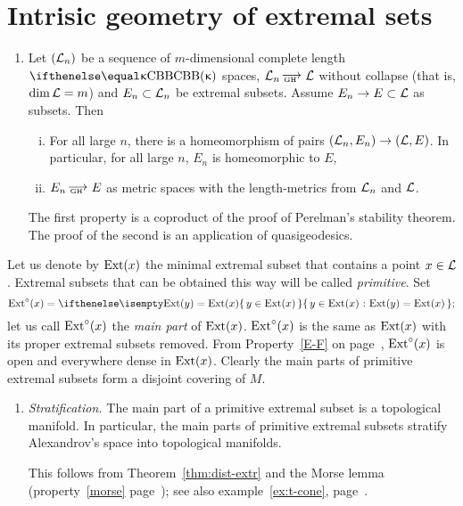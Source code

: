 \section{Intrisic geometry of extremal sets}

\begin{enumerate}
\item 
Let $(\mathcal{L}_n)$ be a sequence of $m$-dimensional complete length $\Alex\kappa$ spaces, 
$\spc{L}_n\GHto \spc{L}$ without collapse 
(that is, $\mathop{\rm dim}\nolimits \mathcal{L}=m$) and $E_n\subset \spc{L}_n$ be extremal subsets. 
Assume $E_n\to E\subset \spc{L}$ as subsets. 
Then 
\begin{enumerate}[(i)]
\item\cite[9.1]{kapovitch:stability} \label{lim-dim-extr} For all large $n$, there is a homeomorphism of pairs $(\spc{L}_n,E_n)\to(\spc{L},E)$. 
In particular, for all large $n$, $E_n$ is homeomorphic to $E$, 
\item\cite[1.2]{petrunin:extremal}\label{lim-intr-extr} $E_n\GHto E$ as metric spaces with the
length-metrics from $\mathcal{L}_n$ and $\mathcal{L}$.
\end{enumerate}
The first property is a coproduct of the proof of Perelman's stability theorem.
The proof of the second is an application of quasigeodesics.
\end{enumerate}


Let us denote by $\mathop{\rm Ext}\nolimits(x)$ the minimal extremal subset that contains a point
$x\in \spc{L}$. 
Extremal subsets that can be obtained this way will be called
\emph{primitive}. 
Set 
\[\Ext^\circ(x)=\set{y\in \Ext(x)}{\Ext(y)=\Ext(x)};\]
let us call $\Ext^\circ(x)$ the \emph{main part} of $\mathop{\rm Ext}\nolimits(x)$.
$\Ext^\circ(x)$ is the same as $\mathop{\rm Ext}\nolimits(x)$ with its proper extremal subsets removed.
From Property~\ref{E-F} on page~\pageref{E-F},  $\Ext^\circ(x)$ is open and everywhere
dense in $\mathop{\rm Ext}\nolimits(x)$.
Clearly the main parts of primitive extremal subsets form a disjoint
covering of $M$.

\begin{enumerate}
\item \cite[3.8]{perelman-petrunin:extremal} {\it Stratification.}\label{strata} The main part of a primitive extremal subset is a
topological manifold. In particular, the main parts of primitive extremal subsets
stratify Alexandrov's space into topological manifolds. 

This follows from Theorem~\ref{thm:dist-extr} and the Morse lemma (property~\ref{morse} page~\pageref{morse}); see also example~\ref{ex:t-cone}, page~\pageref{ex:t-cone}.
\end{enumerate}


